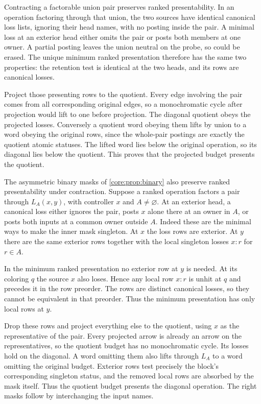 Contracting a factorable union pair preserves ranked
presentability. In an operation factoring through
that union, the two sources have identical canonical
loss lists, ignoring their head names, with no posting
inside the pair. A minimal loss at an exterior head
either omits the pair or posts both members at one
owner. A partial posting leaves the union neutral on
the probe, so could be erased. The unique minimum
ranked presentation therefore has the same two
properties: the retention test is identical at the
two heads, and its rows are canonical losses.

Project those presenting rows to the quotient. Every
edge involving the pair comes from all corresponding
original edges, so a monochromatic cycle after
projection would lift to one before projection.
The diagonal quotient obeys the projected losses.
Conversely a quotient word obeying them lifts by
union to a word obeying the original rows, since
the whole-pair postings are exactly the quotient
atomic statuses. The lifted word lies below the
original operation, so its diagonal lies below the
quotient. This proves that the projected budget
presents the quotient.

The asymmetric binary masks of \cref{core:prop:binary}
also preserve ranked presentability under contraction.
Suppose a ranked operation factors a pair through
$L_A(x,y)$, with controller $x$ and $A\ne\varnothing$.
At an exterior head, a canonical loss either ignores
the pair, posts $x$ alone there at an owner in $A$,
or posts both inputs at a common owner outside $A$.
Indeed these are the minimal ways to make the
inner mask singleton. At $x$ the loss rows are
exterior. At $y$ there are the same exterior rows
together with the local singleton losses $x:r$ for
$r\in A$.

In the minimum ranked presentation no exterior row
at $y$ is needed. At its coloring $q$ the source $x$
also loses. Hence any local row $x:r$ is unhit at
$q$ and precedes it in the row preorder. The rows
are distinct canonical losses, so they cannot be
equivalent in that preorder. Thus the minimum
presentation has only local rows at $y$.

Drop these rows and project everything else to the
quotient, using $x$ as the representative of the pair.
Every projected arrow is already an arrow on the
representatives, so the quotient budget has no
monochromatic cycle. Its losses hold on the diagonal.
A word omitting them also lifts through $L_A$ to a
word omitting the original budget. Exterior rows
test precisely the block's corresponding singleton
status, and the removed local rows are absorbed by
the mask itself. Thus the quotient budget presents
the diagonal operation. The right masks follow by
interchanging the input names.

